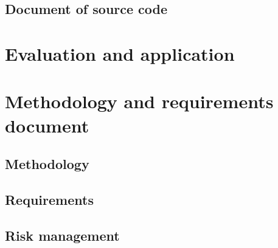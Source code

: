 \documentclass{article}
\begin{document}
\subsection{Document of source code}
\label{sec:documentsource}


\section{Evaluation and application}
\label{sec:eval}


\section{Methodology and requirements document}
\label{sec:methrecdoc}

\subsection{Methodology}
\label{sec:meth}

\subsection{Requirements}
\label{sec:req}


\subsection{Risk management}
\label{sec:riskman}
\end{document}

